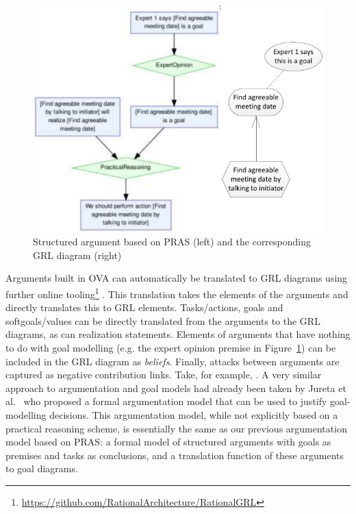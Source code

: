 \begin{figure}[ht]
\centering
\includegraphics[width=\columnwidth]{img/Fig3}
\caption{Structured argument based on PRAS (left) and the corresponding GRL diagram (right)}
\label{fig:pras:example3}
\end{figure}  


Arguments built in OVA can automatically be translated to GRL diagrams using further online tooling\footnote{\url{https://github.com/RationalArchitecture/RationalGRL}} \cite{vanZee-etal:comma2016}. This translation takes the elements of the arguments and directly translates this to GRL elements. Tasks/actions, goals and softgoals/values can be directly translated from the arguments to the GRL diagrams, as can realization statements. Elements of arguments that have nothing to do with goal modelling (e.g. the expert opinion premise in Figure~\ref{fig:pras:example3}) can be included in the GRL diagram as \emph{beliefs}. Finally, attacks between arguments are captured as negative contribution links. Take, for example, . A very similar approach to argumentation and goal models had already been taken by Jureta et al.~\cite{Jureta:RE2008} who proposed a formal argumentation model that can be used to justify goal-modelling decisions. This argumentation model, while not explicitly based on a practical reasoning scheme, is essentially the same as our previous argumentation model based on PRAS: a formal model of structured arguments with goals as premises and tasks as conclusions, and a translation function of these arguments to goal diagrams. 

